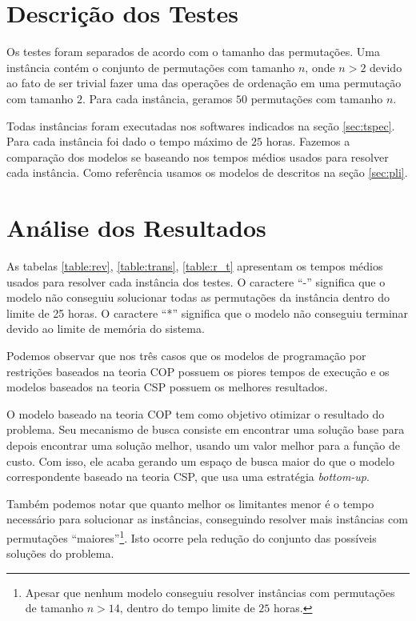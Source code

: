 \section{Descrição dos Testes}
\label{sec:testes}
Os testes foram separados de acordo com o tamanho das
permutações. Uma instância contém o conjunto de permutações com
tamanho $n$, onde $n > 2$ devido ao fato de ser trivial fazer uma das
operações de ordenação em uma permutação com tamanho $2$. Para cada
instância, geramos $50$ permutações com tamanho $n$.

Todas instâncias foram executadas nos softwares indicados na
seção \ref{sec:tspec}. Para cada instância foi dado o tempo máximo de
$25$ horas. Fazemos a comparação dos modelos se baseando nos tempos
médios usados para resolver cada instância. Como referência usamos os
modelos de \pli{} descritos na seção \ref{sec:pli}.

\section{Análise dos Resultados}
\label{sec:analise}
As tabelas \ref{table:rev}, \ref{table:trans}, \ref{table:r_t}
apresentam os tempos médios usados para resolver cada instância dos
testes. O caractere ``-'' significa que o modelo não conseguiu
solucionar todas as permutações da instância dentro do limite de 25
horas. O caractere ``*'' significa que o modelo não conseguiu terminar
devido ao limite de memória do sistema.

Podemos observar que nos três casos que os modelos de programação por
restrições baseados na teoria COP possuem os piores tempos de execução
e os modelos baseados na teoria CSP possuem os melhores
resultados. 

O modelo baseado na teoria COP tem como objetivo otimizar o resultado
do problema. Seu mecanismo de busca consiste em encontrar uma solução
base para depois encontrar uma solução melhor, usando um valor melhor
para a função de custo. Com isso, ele acaba gerando um espaço de busca
maior do que o modelo correspondente baseado na teoria CSP, que usa
uma estratégia \textit{bottom-up}.

Também podemos notar que quanto melhor os limitantes menor é o tempo
necessário para solucionar as instâncias, conseguindo resolver mais
instâncias com permutações ``maiores''\footnote{Apesar que nenhum
modelo conseguiu resolver instâncias com permutações de tamanho $n >
14$, dentro do tempo limite de $25$ horas.}. Isto ocorre pela redução
do conjunto das possíveis soluções do problema.

